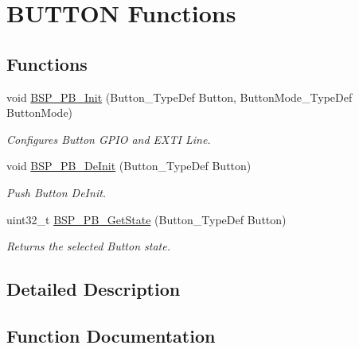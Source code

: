 \hypertarget{group___s_t_m32_f0_x_x___n_u_c_l_e_o___b_u_t_t_o_n___functions}{}\section{B\+U\+T\+T\+ON Functions}
\label{group___s_t_m32_f0_x_x___n_u_c_l_e_o___b_u_t_t_o_n___functions}
\subsection*{Functions}
\begin{DoxyCompactItemize}
\item 
void \hyperlink{group___s_t_m32_f0_x_x___n_u_c_l_e_o___b_u_t_t_o_n___functions_gad31c8db50a71c1f6dbfe132d72ba0bc6}{B\+S\+P\+\_\+\+P\+B\+\_\+\+Init} (Button\+\_\+\+Type\+Def Button, Button\+Mode\+\_\+\+Type\+Def Button\+Mode)
\begin{DoxyCompactList}\small\item\em Configures Button G\+P\+IO and E\+X\+TI Line. \end{DoxyCompactList}\item 
void \hyperlink{group___s_t_m32_f0_x_x___n_u_c_l_e_o___b_u_t_t_o_n___functions_gac1bd746e7f6037d50ca3784ebe05686e}{B\+S\+P\+\_\+\+P\+B\+\_\+\+De\+Init} (Button\+\_\+\+Type\+Def Button)
\begin{DoxyCompactList}\small\item\em Push Button De\+Init. \end{DoxyCompactList}\item 
uint32\+\_\+t \hyperlink{group___s_t_m32_f0_x_x___n_u_c_l_e_o___b_u_t_t_o_n___functions_ga8f0978b6cffda9c67266ddfdb3a0abf7}{B\+S\+P\+\_\+\+P\+B\+\_\+\+Get\+State} (Button\+\_\+\+Type\+Def Button)
\begin{DoxyCompactList}\small\item\em Returns the selected Button state. \end{DoxyCompactList}\end{DoxyCompactItemize}


\subsection{Detailed Description}


\subsection{Function Documentation}
\mbox{\label{group___s_t_m32_f0_x_x___n_u_c_l_e_o___b_u_t_t_o_n___functions_gac1bd746e7f6037d50ca3784ebe05686e}} 
